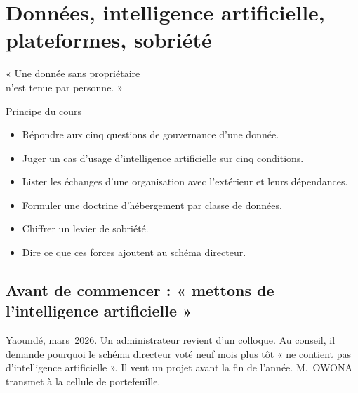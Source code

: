 
\chapter{Données, intelligence artificielle, plateformes, sobriété}
\label{chap:donnees}

\epigraph{%
    « Une donnée sans propriétaire\\
    n'est tenue par personne. »%
}{Principe du cours}


\begin{boxobjectifs}
\begin{itemize}
    \item Répondre aux cinq questions de gouvernance d'une donnée.
    \item Juger un cas d'usage d'intelligence artificielle sur cinq conditions.
    \item Lister les échanges d'une organisation avec l'extérieur et leurs dépendances.
    \item Formuler une doctrine d'hébergement par classe de données.
    \item Chiffrer un levier de sobriété.
    \item Dire ce que ces forces ajoutent au schéma directeur.
\end{itemize}
\end{boxobjectifs}

\bigskip

\section*{Avant de commencer : « mettons de l'intelligence artificielle »}

Yaoundé, mars~2026. Un administrateur revient d'un colloque. Au conseil, il demande pourquoi le schéma directeur
voté neuf mois plus tôt « ne contient pas d'intelligence artificielle ». Il veut un projet avant la fin de
l'année. M.~OWONA transmet à la cellule de portefeuille.

